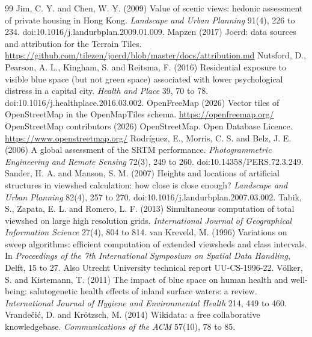 \documentclass[11pt,a4paper]{article}
\begin{document}
\begin{thebibliography}{99}
 Jim, C. Y. and Chen, W. Y. (2009) Value of scenic views: hedonic assessment of private housing in Hong Kong. \textit{Landscape and Urban Planning} 91(4), 226 to 234. doi:10.1016/j.landurbplan.2009.01.009.
 Mapzen (2017) Joerd: data sources and attribution for the Terrain Tiles. \url{https://github.com/tilezen/joerd/blob/master/docs/attribution.md}
 Nutsford, D., Pearson, A. L., Kingham, S. and Reitsma, F. (2016) Residential exposure to visible blue space (but not green space) associated with lower psychological distress in a capital city. \textit{Health and Place} 39, 70 to 78. doi:10.1016/j.healthplace.2016.03.002.
 OpenFreeMap (2026) Vector tiles of OpenStreetMap in the OpenMapTiles schema. \url{https://openfreemap.org/}
 OpenStreetMap contributors (2026) OpenStreetMap. Open Database Licence. \url{https://www.openstreetmap.org/}
 Rodr\'iguez, E., Morris, C. S. and Belz, J. E. (2006) A global assessment of the SRTM performance. \textit{Photogrammetric Engineering and Remote Sensing} 72(3), 249 to 260. doi:10.14358/PERS.72.3.249.
 Sander, H. A. and Manson, S. M. (2007) Heights and locations of artificial structures in viewshed calculation: how close is close enough? \textit{Landscape and Urban Planning} 82(4), 257 to 270. doi:10.1016/j.landurbplan.2007.03.002.
 Tabik, S., Zapata, E. L. and Romero, L. F. (2013) Simultaneous computation of total viewshed on large high resolution grids. \textit{International Journal of Geographical Information Science} 27(4), 804 to 814.
 van Kreveld, M. (1996) Variations on sweep algorithms: efficient computation of extended viewsheds and class intervals. In \textit{Proceedings of the 7th International Symposium on Spatial Data Handling}, Delft, 15 to 27. Also Utrecht University technical report UU-CS-1996-22.
 V\"olker, S. and Kistemann, T. (2011) The impact of blue space on human health and well-being: salutogenetic health effects of inland surface waters: a review. \textit{International Journal of Hygiene and Environmental Health} 214, 449 to 460.
 Vrande\v{c}i\'c, D. and Kr\"otzsch, M. (2014) Wikidata: a free collaborative knowledgebase. \textit{Communications of the ACM} 57(10), 78 to 85.

\end{thebibliography}
\end{document}
